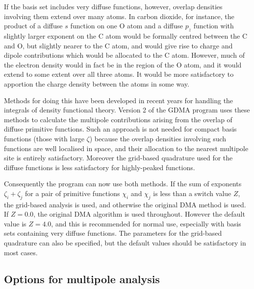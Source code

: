 \documentclass[12pt,txfonts]{paper}
\let\cite=\citep
\begin{document}
If the basis set includes very diffuse functions, however, overlap
densities involving them extend over many atoms. In carbon dioxide,
for instance, the product of a diffuse $s$ function on one O atom and
a diffuse $p_z$ function with slightly larger exponent on the C atom
would be formally centred between the C and O, but slightly nearer to
the C atom, and would give rise to charge and dipole contributions
which would be allocated to the C atom. However, much of the electron
density would in fact be in the region of the O atom, and it would
extend to some extent over all three atoms. It would be more
satisfactory to apportion the charge density between the atoms in some
way.

Methods for doing this have been developed in recent years for
handling the integrals of density functional theory. Version 2 of the
GDMA program\cite{Stone05b} uses these methods to calculate the multipole
contributions arising from the overlap of diffuse primitive functions.
Such an approach is not needed for compact basis functions (those with
large $\zeta$) because the overlap densities involving such functions
are well localised in space, and their allocation to the nearest
multipole site is entirely satisfactory. Moreover the grid-based
quadrature used for the diffuse functions is less satisfactory for
highly-peaked functions.

Consequently the program can now use both methods. If the sum of
exponents $\zeta_i+\zeta_j$ for a pair of primitive functions $\chi_i$
and $\chi_j$ is less than a switch value $Z$, the grid-based analysis
is used, and otherwise the original DMA method is used. If $Z=0.0$,
the original DMA algorithm is used throughout. However the default
value is $Z=4.0$, and this is recommended for normal use, especially
with basis sets containing very diffuse functions. The parameters for
the grid-based quadrature can also be specified, but the default
values should be satisfactory in most cases.

\subsection {Options for multipole analysis}
\end{document}
